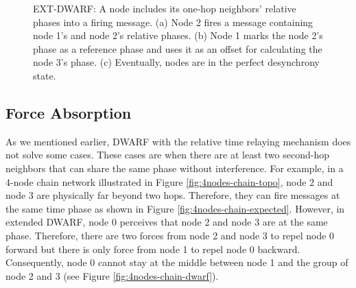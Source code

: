 \begin{figure}[!t]
{{	\label{fig:broadcast-relative-ring}}
	\hfil
}
\caption{EXT-DWARF: A node includes its one-hop neighbors' relative phases into a firing message. (a) Node 2 fires a message containing node 1's and node 2's relative phases. (b) Node 1 marks the node 2's phase as a reference phase and uses it as an offset for calculating the node 3's phase. (c) Eventually, nodes are in the perfect desynchrony state.}
\label{fig:broadcast-relative}
\lofcont
\end{figure}


\subsection{Force Absorption}
\label{sec:absorption}
As we mentioned earlier, DWARF with the relative time relaying mechanism does not solve some cases.
These cases are when there are at least two second-hop neighbors that can share the same phase without interference. For example, in a 4-node chain network illustrated in Figure \ref{fig:4nodes-chain-topo}, node 2 and node 3 are physically far beyond two hops. Therefore, they can fire messages at the same time phase as shown in Figure \ref{fig:4nodes-chain-expected}.
However, in extended DWARF, node 0 perceives that node 2 and node 3 are at the same phase. Therefore, there are two forces from node 2 and node 3 to repel node 0 forward but there is only force from node 1 to repel node 0 backward. Consequently, node 0 cannot stay at the middle between node 1 and the group of node 2 and 3 (see Figure \ref{fig:4nodes-chain-dwarf}). 

